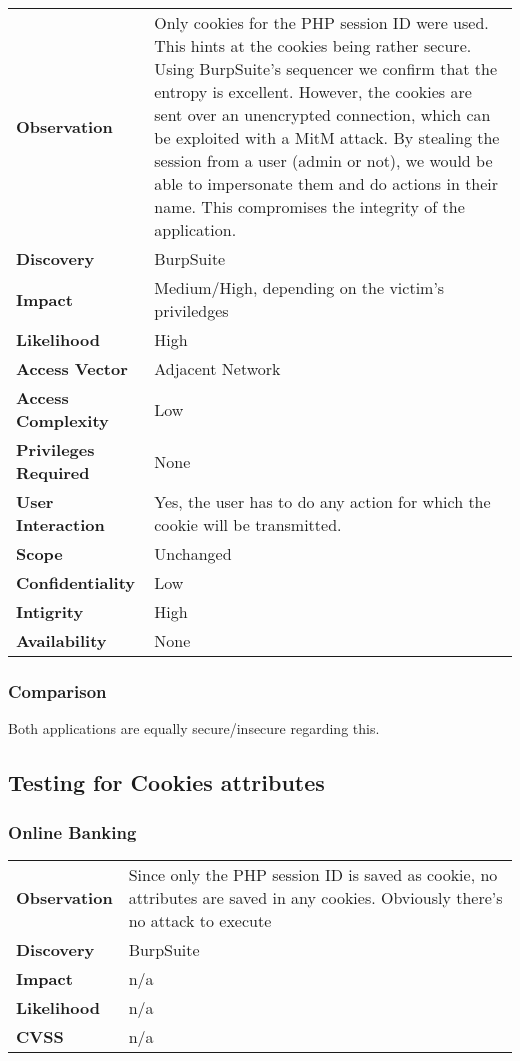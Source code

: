 \begin{tabular}{l|p{10cm}}
\textbf{Observation} & Only cookies for the PHP session ID were used. This hints at the cookies being rather secure. Using BurpSuite's sequencer we confirm that the entropy is excellent. However, the cookies are sent over an unencrypted connection, which can be exploited with a MitM attack. By stealing the session from a user (admin or not), we would be able to impersonate them and do actions in their name. This compromises the integrity of the application. \\
\textbf{Discovery} & BurpSuite \\
\textbf{Impact} &Medium/High, depending on the victim's priviledges \\
\textbf{Likelihood} & High \\
\textbf{Access Vector} & Adjacent Network \\
\textbf{Access Complexity} & Low\\
\textbf{Privileges Required} & None \\
\textbf{User Interaction} & Yes, the user has to do any action for which the cookie will be transmitted. \\
\textbf{Scope} & Unchanged \\
\textbf{Confidentiality} & Low \\
\textbf{Intigrity} & High\\
\textbf{Availability} & None \\
\end{tabular}

\subsubsection*{Comparison}
Both applications are equally secure/insecure regarding this.

\clearpage


\subsection{Testing for Cookies attributes}

\subsubsection*{Online Banking}

\begin{tabular}{l|p{10cm}}
\textbf{Observation} & Since only the PHP session ID is saved as cookie, no attributes are saved in any cookies. Obviously there's no attack to execute  \\
\textbf{Discovery} & BurpSuite \\
\textbf{Impact} & n/a \\
\textbf{Likelihood} & n/a \\
\textbf{CVSS} & n/a \\
\end{tabular}

